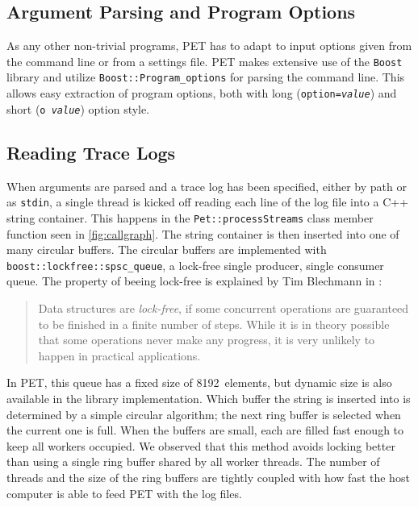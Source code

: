 \subsection{Argument Parsing and Program Options}

As any other non-trivial programs, PET has to adapt to input options given from
the command line or from a settings file. PET makes extensive use of the
\texttt{Boost} library and utilize \texttt{Boost::Program\_options} for parsing
the command line. This allows easy extraction of program options, both with long
(\texttt{\textemdash \textemdash option=\emph{value}}) and short
(\texttt{\textemdash o~\emph{value}}) option style.


\subsection{Reading Trace Logs}

When arguments are parsed and a trace log has been specified, either by path or
as \texttt{stdin}, a single thread is kicked off reading each line of the log
file into a C++ string container. This happens in the
\texttt{Pet::processStreams} class member function seen in \autoref{fig:callgraph}. The string
container is then inserted into one of many circular buffers. The circular
buffers are implemented with \texttt{boost::lockfree::spsc\_queue}, a lock-free
single producer, single consumer queue. The property of beeing lock-free is
explained by Tim Blechmann in \cite{boostlockfree}:

\begin{quote}
    Data structures are \emph{lock-free}, if some concurrent operations
are guaranteed to be finished in a finite number of steps. While it is in theory
possible that some operations never make any progress, it is very unlikely to
happen in practical applications.
\end{quote}

In PET, this queue has a fixed size of 8192~elements, but dynamic size is also
available in the library implementation. Which buffer the string is inserted
into is determined by a simple circular algorithm; the next ring buffer is
selected when the current one is full. When the buffers are small, each are
filled fast enough to keep all workers occupied. We observed that this method
avoids locking better than using a single ring buffer shared by all worker
threads. The number of threads and the size of the ring buffers are tightly
coupled with how fast the host computer is able to feed PET with the log files.


